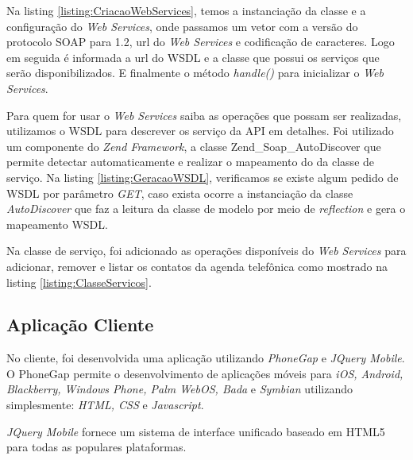 \documentclass{acm_proc_article-sp}
\begin{document}
	Na listing \ref{listing:CriacaoWebServices}, temos a instanciação da classe e a configuração do \emph{Web Services}, onde passamos um vetor com a versão do protocolo SOAP para 1.2, url do \emph{Web Services} e codificação de caracteres. Logo em seguida é informada a url do WSDL e a classe que possui os serviços que serão disponibilizados. E finalmente o método \emph{handle()} para inicializar o \emph{Web Services}.
	
	
	
	Para quem for usar o \emph{Web Services} saiba as operações que possam ser realizadas, utilizamos o WSDL para descrever os serviço da API em detalhes. Foi utilizado um componente do \emph{Zend Framework}, a classe Zend\_Soap\_AutoDiscover que permite detectar automaticamente e realizar o mapeamento do da classe de serviço. Na listing \ref{listing:GeracaoWSDL}, verificamos se existe algum pedido de WSDL por parâmetro \emph{GET}, caso exista ocorre a instanciação da classe \emph{AutoDiscover} que faz a leitura da classe de modelo por meio de \emph{reflection} e gera o mapeamento WSDL.
	
	
	
	Na classe de serviço, foi adicionado as operações disponíveis do \emph{Web Services} para adicionar, remover e listar os contatos da agenda telefônica como mostrado na listing \ref{listing:ClasseServicos}.
	
	
	
	\subsection{Aplicação Cliente}
	
	No cliente, foi desenvolvida uma aplicação utilizando \emph{PhoneGap} e \emph{JQuery Mobile}. O PhoneGap permite o desenvolvimento de aplicações móveis para \emph{iOS, Android, Blackberry, Windows Phone, Palm WebOS, Bada} e \emph{Symbian} utilizando simplesmente: \emph{HTML, CSS} e \emph{Javascript}.\cite{PHONEGAPSITE}
	
	\emph{JQuery Mobile} fornece um sistema de interface unificado baseado em HTML5 para todas as populares plataformas.\cite{JQUERYMOBILESITE}
	
\end{document}
